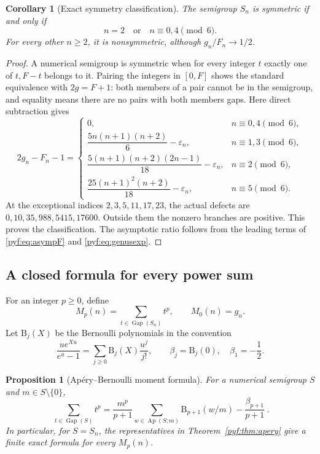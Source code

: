 \documentclass[11pt,a4paper]{article}
\numberwithin{equation}{section}
\newtheorem{proposition}[theorem]{Proposition}
\newtheorem{corollary}[theorem]{Corollary}
\theoremstyle{definition}
\newcommand{\Ap}{\operatorname{Ap}}
\newcommand{\Gap}{\operatorname{Gap}}
\newcommand{\eps}{\varepsilon}
\newcommand{\Bern}{\mathrm B}
\begin{document}
\begin{corollary}[Exact symmetry classification]\label{pyf:cor:symmetry}
The semigroup $S_n$ is symmetric if and only if
\begin{equation}\label{pyf:eq:symmetric}
n=2\quad\text{or}\quad n\equiv0,4\pmod6.
\end{equation}
For every other $n\geq2$, it is nonsymmetric, although
$g_n/F_n\longrightarrow1/2$.
\end{corollary}

\begin{proof}
A numerical semigroup is symmetric when for every integer $t$ exactly one
of $t,F-t$ belongs to it. Pairing the integers in $[0,F]$ shows the standard
equivalence with $2g=F+1$: both members of a pair cannot be in the
semigroup, and equality means there are no pairs with both members gaps.
Here direct subtraction gives
\begin{equation}\label{pyf:eq:defect}
2g_n-F_n-1=
\begin{cases}
0,&n\equiv0,4\pmod6,\\
\dfrac{5n(n+1)(n+2)}6-\eps_n,&n\equiv1,3\pmod6,\\
\dfrac{5(n+1)(n+2)(2n-1)}{18}-\eps_n,&n\equiv2\pmod6,\\
\dfrac{25(n+1)^2(n+2)}{18}-\eps_n,&n\equiv5\pmod6.
\end{cases}
\end{equation}
At the exceptional indices $2,3,5,11,17,23$, the actual defects are
$0,10,35,988,5415,17600$. Outside them the nonzero branches are positive.
This proves the classification. The asymptotic ratio follows from the
leading terms of \eqref{pyf:eq:asympF} and \eqref{pyf:eq:genusexp}.
\end{proof}

\subsection{A closed formula for every power sum}

For an integer $p\geq0$, define
\[
M_p(n)=\sum_{t\in\Gap(S_n)}t^p,
\qquad M_0(n)=g_n.
\]
Let $\Bern_j(X)$ be the Bernoulli polynomials in the convention
\[
\frac{u e^{Xu}}{e^u-1}=\sum_{j\geq0}\Bern_j(X)\frac{u^j}{j!},
\qquad \beta_j=\Bern_j(0),\quad \beta_1=-\frac12.
\]

\begin{proposition}[Ap\'ery--Bernoulli moment formula]\label{pyf:prop:bernoulli}
For a numerical semigroup $S$ and $m\in S\setminus\{0\}$,
\begin{equation}\label{pyf:eq:moment}
\boxed{\ \sum_{t\in\Gap(S)}t^p
=\frac{m^p}{p+1}\sum_{w\in\Ap(S;m)}
       \Bern_{p+1}(w/m)-\frac{\beta_{p+1}}{p+1}\ }.
\end{equation}
In particular, for $S=S_n$, the representatives in
Theorem~\ref{pyf:thm:apery} give a finite exact formula for every $M_p(n)$.
\end{proposition}
\end{document}

